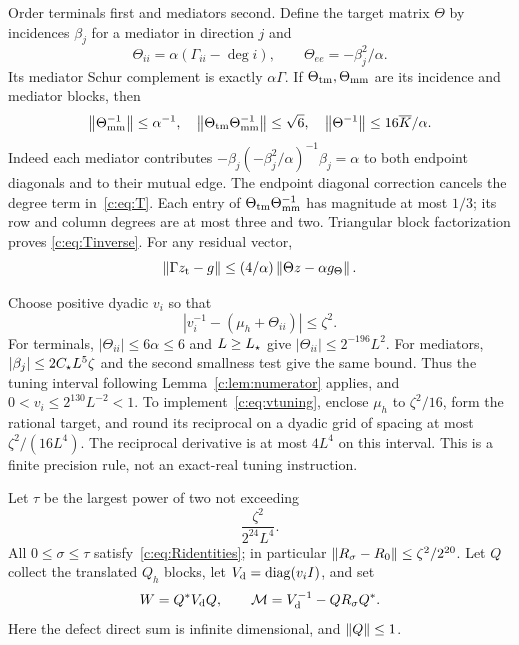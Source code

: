 Order terminals first and mediators second. Define the target matrix
$\Theta$ by incidences $\beta_j$ for a mediator in direction $j$ and
\begin{equation}
 \Theta_{ii}=\alpha(\Gamma_{ii}-\deg i),\qquad
 \Theta_{ee}=-\beta_j^2/\alpha.                            \label{c:eq:T}
\end{equation}
Its mediator Schur complement is exactly $\alpha\Gamma$. If $\Theta_{\rm tm},\Theta_{\rm mm}$
are its incidence and mediator blocks, then
\begin{equation}
 \left\lVert \Theta_{\rm mm}^{-1}\right\rVert\le\alpha^{-1},\quad
 \left\lVert \Theta_{\rm tm}\Theta_{\rm mm}^{-1}\right\rVert\le\sqrt6,\quad
 \left\lVert \Theta^{-1}\right\rVert\le16\overline K/\alpha.                         \label{c:eq:Tinverse}
\end{equation}
Indeed each mediator contributes
$-\beta_j(-\beta_j^2/\alpha)^{-1}\beta_j=\alpha$ to both endpoint
diagonals and to their mutual edge. The endpoint diagonal correction
cancels the degree term in~\eqref{c:eq:T}. Each entry of
$\Theta_{\rm tm}\Theta_{\rm mm}^{-1}$ has magnitude at most $1/3$; its row and column degrees
are at most three and two. Triangular block factorization proves
\eqref{c:eq:Tinverse}. For any residual vector,
\begin{equation}
 \left\lVert \Gamma z_{\rm t}-g\right\rVert\le(4/\alpha)
             \left\lVert \Theta z-\alpha g_\Theta\right\rVert.                 \label{c:eq:mediatorres}
\end{equation}

Choose positive dyadic $v_i$ so that
\begin{equation}
 |v_i^{-1}-(\mu_h+\Theta_{ii})|\le\zeta^2.                \label{c:eq:vtuning}
\end{equation}
For terminals, $|\Theta_{ii}|\le6\alpha\le6$ and $L\ge L_\star$ give
$|\Theta_{ii}|\le2^{-196}L^2$. For mediators, $|\beta_j|\le2C_\star L^5\zeta$
and the second smallness test give the same bound.
Thus the tuning interval following Lemma~\ref{c:lem:numerator} applies,
and $0<v_i\le2^{130}L^{-2}<1$.
To implement~\eqref{c:eq:vtuning}, enclose $\mu_h$ to $\zeta^2/16$,
form the rational target, and round its reciprocal on a dyadic grid
of spacing at most $\zeta^2/(16L^4)$. The reciprocal derivative is
at most $4L^4$ on this interval. This is a finite precision rule,
not an exact-real tuning instruction.

Let $\tau$ be the largest power of two not exceeding
\begin{equation}
 \frac{\zeta^2}{2^{24}L^4}.                           \label{c:eq:tau}
\end{equation}
All $0\le\sigma\le\tau$ satisfy~\eqref{c:eq:Ridentities}; in particular
$\left\lVert R_\sigma-R_0\right\rVert\le\zeta^2/2^{20}$.
Let $Q$ collect the translated $Q_h$ blocks, let $V_{\rm d}=\operatorname{diag}(v_iI)$,
and set
\begin{equation}
 W=Q^*V_{\rm d}Q,\qquad
 \mathcal M=V_{\rm d}^{-1}-QR_\sigma Q^*.                          \label{c:eq:Mdef}
\end{equation}
Here the defect direct sum is infinite dimensional, and $\left\lVert Q\right\rVert\le1$.

